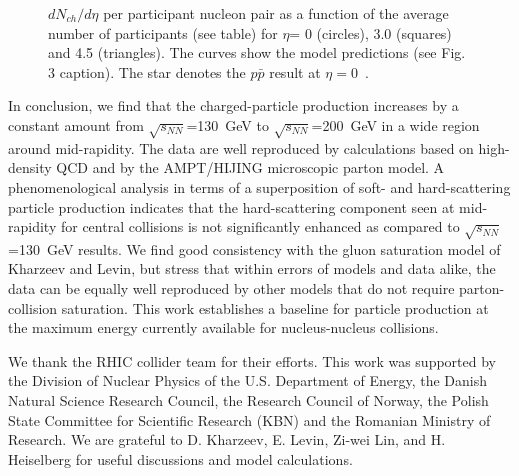\documentclass[preprint,showpacs,preprintnumbers,amsmath,amssymb]{revtex4}
\begin{document}
\begin{figure}
  \caption{
    $dN_{ch}/d\eta$ per participant nucleon pair as a
    function of the average number of participants (see table)
    for $\eta$= 0 (circles), 3.0 (squares) and 4.5 (triangles). 
    The curves show the model predictions (see Fig. 3 caption). 
    The star denotes the $p\bar p$ result at 
    $\eta=0$~\cite{Alner86}.}
  \label{Npart}
\end{figure}

In conclusion, we find that the charged-particle production 
increases by a constant amount from 
$\sqrt{s_{NN}}$=130~GeV to $\sqrt{s_{NN}}$=200~GeV in a
wide region around mid-rapidity.  
The data are well reproduced by
calculations based on high-density QCD and by the AMPT/HIJING
microscopic parton model. A phenomenological analysis in
terms of a superposition of soft- and hard-scattering 
particle production indicates that the  hard-scattering
component seen at  mid-rapidity for central collisions
is not significantly
enhanced as compared to 
$\sqrt{s_{NN}}$=130~GeV results. We find good
consistency with the gluon saturation model of Kharzeev and Levin, but
stress that within errors of models and data alike, the data can be
equally well reproduced by other models that do not require 
parton-collision saturation. This 
work establishes a baseline for particle production at the maximum
energy currently available for nucleus-nucleus collisions.

We thank the RHIC collider team for their efforts. 
This work was supported by the Division of Nuclear Physics
of the U.S. Department of Energy,  
the Danish Natural Science Research Council, the Research Council of
Norway, the Polish State Committee for Scientific Research (KBN) 
and the Romanian
Ministry of Research. 
We are grateful to D. Kharzeev, %
E. Levin, %
Zi-wei Lin, and %
H. Heiselberg for useful discussions and 
model calculations. %
\end{document}
